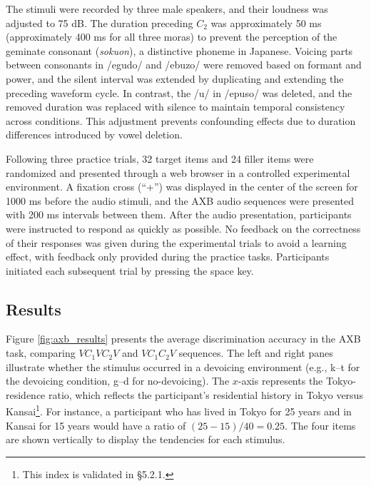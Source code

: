 The stimuli were recorded by three male speakers, and their loudness was adjusted to 75 dB. The duration preceding $C_\text{2}$ was approximately 50 ms (approximately 400 ms for all three moras) to prevent the perception of the geminate consonant (\textit{sokuon}), a distinctive phoneme in Japanese. Voicing parts between consonants in /egudo/ and /ebuzo/ were removed based on formant and power, and the silent interval was extended by duplicating and extending the preceding waveform cycle.
In contrast, the /u/ in /epuso/ was deleted, and the removed duration was replaced with silence  
to maintain temporal consistency across conditions.  
This adjustment prevents confounding effects due to duration differences introduced by vowel deletion.  

Following three practice trials, 32 target items and 24 filler items were randomized and presented through a web browser in a controlled experimental environment. A fixation cross (``+'') was displayed in the center of the screen for 1000 ms before the audio stimuli, and the AXB audio sequences were presented with 200 ms intervals between them. After the audio presentation, participants were instructed to respond as quickly as possible. No feedback on the correctness of their responses was given during the experimental trials to avoid a learning effect, with feedback only provided during the practice tasks. Participants initiated each subsequent trial by pressing the space key.


\subsection{Results}

Figure \ref{fig:axb_results} presents the average discrimination accuracy in the AXB task, comparing $VC_\text{1}VC_\text{2}V$ and $VC_\text{1}C_\text{2}V$ sequences. The left and right panes illustrate whether the stimulus occurred in a devoicing environment (e.g., k--t for the devoicing condition, g--d for no-devoicing). The $x$-axis represents the Tokyo-residence ratio, which reflects the participant's residential history in Tokyo versus Kansai\footnote{This index is validated in \S5.2.1.}. For instance, a participant who has lived in Tokyo for 25 years and in Kansai for 15 years would have a ratio of $(25-15)/40 = 0.25$. The four items are shown vertically to display the tendencies for each stimulus.

